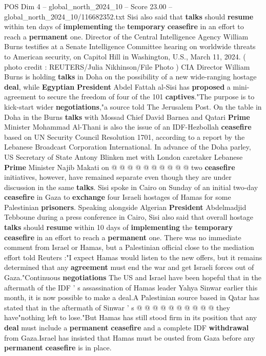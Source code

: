 \begin{textsample}{POS Dim 4 – global\_north\_2024\_10 – Score 23.00 – global\_north\_2024\_10/116682352.txt}  \label{ex:f4_pos_401}
Sisi also said that \textbf{talks} should \textbf{resume} within ten days of \textbf{implementing} the \textbf{temporary} \textbf{ceasefire} in an effort to reach a \textbf{permanent} one.
Director of the Central Intelligence Agency William Burns testifies at a Senate Intelligence Committee hearing on worldwide threats to American security, on Capitol Hill in Washington, U.S., March 11, 2024. ( photo credit : REUTERS/Julia Nikhinson/File Photo ) CIA Director William Burns is holding \textbf{talks} in Doha on the possibility of a new wide-ranging hostage \textbf{deal}, while \textbf{Egyptian} \textbf{President} Abdel Fattah al-Sisi has \textbf{proposed} a mini-agreement to secure the freedom of four of the 101 \textbf{captives}."The purpose is to kick-start wider \textbf{negotiations},"a source told The Jerusalem Post.
On the table in Doha in the Burns \textbf{talks} with Mossad Chief David Barnea and Qatari \textbf{Prime} Minister Mohammad Al-Thani is also the issue of an IDF-Hezbollah \textbf{ceasefire} based on UN Security Council Resolution 1701, according to a report by the Lebanese Broadcast Corporation International.
In advance of the Doha parley, US Secretary of State Antony Blinken met with London caretaker Lebanese \textbf{Prime} Minister Najib Makati on @ @ @ @ @ @ @ @ @ @ two \textbf{ceasefire} initiatives, however, have remained separate even though they are under discussion in the same \textbf{talks}.
Sisi spoke in Cairo on Sunday of an initial two-day \textbf{ceasefire} in Gaza to \textbf{exchange} four Israeli hostages of Hamas for some Palestinian \textbf{prisoners}.
Speaking alongside Algerian \textbf{President} Abdelmadjid Tebboune during a press conference in Cairo, Sisi also said that overall hostage \textbf{talks} should \textbf{resume} within 10 days of \textbf{implementing} the \textbf{temporary} \textbf{ceasefire} in an effort to reach a \textbf{permanent} one.
There was no immediate comment from Israel or Hamas, but a Palestinian official close to the mediation effort told Reuters :"I expect Hamas would listen to the new offers, but it remains determined that any \textbf{agreement} must end the war and get Israeli forces out of Gaza."Continuous \textbf{negotiations} The US and Israel have been hopeful that in the aftermath of the IDF ' s assassination of Hamas leader Yahya Sinwar earlier this month, it is now possible to make a deal.A Palestinian source based in Qatar has stated that in the aftermath of Sinwar ' s @ @ @ @ @ @ @ @ @ @ they have"nothing left to lose."But Hamas has still stood firm in its position that any \textbf{deal} must include a \textbf{permanent} \textbf{ceasefire} and a complete IDF \textbf{withdrawal} from Gaza.Israel has insisted that Hamas must be ousted from Gaza before any \textbf{permanent} \textbf{ceasefire} is in place.

\end{textsample}
